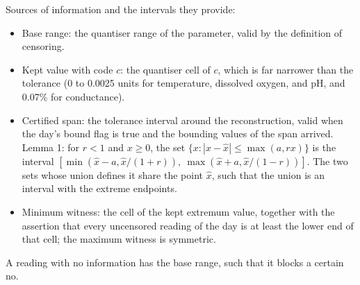 Sources of information and the intervals they provide:
\begin{itemize}
  \item Base range: the quantiser range of the parameter, valid by the definition of censoring.
  \item Kept value with code $c$: the quantiser cell of $c$, which is far narrower than the tolerance (0 to 0.0025 units for temperature, dissolved oxygen, and pH, and 0.07\% for conductance).
  \item Certified span: the tolerance interval around the reconstruction, valid when the day's bound flag is true and the bounding values of the span arrived. Lemma 1: for $r < 1$ and $x \ge 0$, the set $\{x : |x - \hat{x}| \le \max(a, rx)\}$ is the interval $[\min(\hat{x} - a, \hat{x}/(1 + r)),\ \max(\hat{x} + a, \hat{x}/(1 - r))]$. The two sets whose union defines it share the point $\hat{x}$, such that the union is an interval with the extreme endpoints.
  \item Minimum witness: the cell of the kept extremum value, together with the assertion that every uncensored reading of the day is at least the lower end of that cell; the maximum witness is symmetric.
\end{itemize}
A reading with no information has the base range, such that it blocks a certain no.

